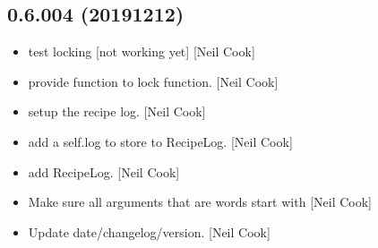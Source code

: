 \documentclass[a4paper,10pt,english]{report}
\begin{document}
\subsection{0.6.004 (2019\sphinxhyphen{}12\sphinxhyphen{}12)}
\label{\detokenize{misc/changelog:id33}}\begin{itemize}
\item {} 
 \sphinxhyphen{} test locking {[}not working yet{]} {[}Neil Cook{]}

\item {} 
 \sphinxhyphen{} provide function to lock function. {[}Neil Cook{]}

\item {} 
 \sphinxhyphen{} setup the recipe log. {[}Neil Cook{]}

\item {} 
 \sphinxhyphen{} add a self.log to store to RecipeLog. {[}Neil
Cook{]}

\item {} 
 \sphinxhyphen{} add RecipeLog. {[}Neil Cook{]}

\item {} 
Make sure all arguments that are words start with \textendash{} {[}Neil Cook{]}

\item {} 
Update date/changelog/version. {[}Neil Cook{]}

\end{itemize}
\end{document}
